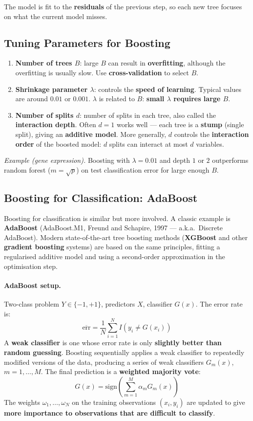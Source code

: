 \documentclass[11pt,a4paper]{article}
\theoremstyle{definition}
\theoremstyle{plain}
\theoremstyle{remark}
\begin{document}
The model is fit to the \textbf{residuals} of the previous step, so each new tree focuses on what the current model misses.

\subsection{Tuning Parameters for Boosting}

\begin{enumerate}
    \item \textbf{Number of trees $B$}: large $B$ can result in \textbf{overfitting}, although the overfitting is usually slow. Use \textbf{cross-validation} to select $B$.
    \item \textbf{Shrinkage parameter $\lambda$}: controls the \textbf{speed of learning}. Typical values are around $0.01$ or $0.001$. $\lambda$ is related to $B$: \textbf{small $\lambda$ requires large $B$}.
    \item \textbf{Number of splits $d$}: number of splits in each tree, also called the \textbf{interaction depth}. Often $d = 1$ works well — each tree is a \textbf{stump} (single split), giving an \textbf{additive model}. More generally, $d$ controls the \textbf{interaction order} of the boosted model: $d$ splits can interact at most $d$ variables.
\end{enumerate}

\textit{Example (gene expression).} Boosting with $\lambda = 0.01$ and depth $1$ or $2$ outperforms random forest ($m = \sqrt{p}$) on test classification error for large enough $B$.

\subsection{Boosting for Classification: AdaBoost}

Boosting for classification is similar but more involved. A classic example is \textbf{AdaBoost} (AdaBoost.M1, Freund and Schapire, 1997 — a.k.a.\ Discrete AdaBoost). Modern state-of-the-art tree boosting methods (\textbf{XGBoost} and other \textbf{gradient boosting} systems) are based on the same principles, fitting a regularised additive model and using a second-order approximation in the optimisation step.

\paragraph{AdaBoost setup.} Two-class problem $Y \in \{-1, +1\}$, predictors $X$, classifier $G(x)$. The error rate is:
\[
    \overline{\mathrm{err}} = \frac{1}{N} \sum_{i=1}^{N} I(y_i \neq G(x_i))
\]
A \textbf{weak classifier} is one whose error rate is only \textbf{slightly better than random guessing}. Boosting sequentially applies a weak classifier to repeatedly modified versions of the data, producing a series of weak classifiers $G_m(x)$, $m = 1, \ldots, M$. The final prediction is a \textbf{weighted majority vote}:
\[
    G(x) = \mathrm{sign}\!\left( \sum_{m=1}^{M} \alpha_m G_m(x) \right)
\]
The weights $\omega_1, \ldots, \omega_N$ on the training observations $(x_i, y_i)$ are updated to give \textbf{more importance to observations that are difficult to classify}.
\end{document}
